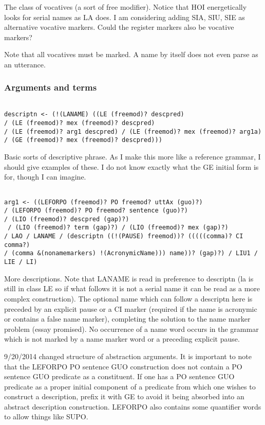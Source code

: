\documentclass[12pt]{article}
\begin{document}
The class of vocatives (a sort of free modifier).  Notice that HOI energetically looks for serial names as LA does.  I am considering
adding SIA, SIU, SIE as alternative vocative markers.  Could the register markers also be vocative markers?

Note that all vocatives must be marked.   A name by itself does not even parse as an utterance.

\subsubsection{Arguments and terms}

\begin{verbatim}

descriptn <- (!(LANAME) ((LE (freemod)? descpred) 
/ (LE (freemod)? mex (freemod)? descpred) 
/ (LE (freemod)? arg1 descpred) / (LE (freemod)? mex (freemod)? arg1a) 
/ (GE (freemod)? mex (freemod)? descpred)))

\end{verbatim}

Basic sorts of descriptive phrase.  As I make this more like a reference grammar, I should give examples of these.
I do not know exactly what the GE initial form is for, though I can imagine.

\begin{verbatim}

arg1 <- ((LEFORPO (freemod)? PO freemod? uttAx (guo)?) 
/ (LEFORPO (freemod)? PO freemod? sentence (guo)?) 
/ (LIO (freemod)? descpred (gap)?)
 / (LIO (freemod)? term (gap)?) / (LIO (freemod)? mex (gap)?) 
/ LAO / LANAME / (descriptn ((!(PAUSE) freemod))? (((((comma)? CI comma?) 
/ (comma &(nonamemarkers) !(AcronymicName))) name))? (gap)?) / LIU1 / LIE / LI)

\end{verbatim}

More descriptions.  Note that LANAME is read in preference to descriptn (la is still in class LE so if what follows it is not a serial name it can be read as a more complex construction).  The optional name which can follow a descriptn here is preceded by an explicit pause or a CI marker (required if the name is acronymic or contains a false name marker), completing the solution to the name marker problem (essay promised).  No occurrence of a name word occurs in the grammar which is not marked by a name marker word or a preceding explicit pause.

9/20/2014 changed structure of abstraction arguments.  It is important to note that the LEFORPO PO sentence GUO construction does not contain a PO sentence GUO predicate as a constituent.  If one has a PO sentence GUO predicate as a proper initial component of a predicate from which one wishes to construct a description, prefix it with GE to avoid it being
absorbed into an abstract description construction.  LEFORPO also contains some quantifier words to allow things like SUPO.
\end{document}

